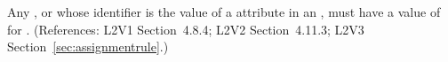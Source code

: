 Any \Compartment, \Species or \Parameter whose identifier is the value of a
 attribute in an \AssignmentRule, must have a value of
 for .  (References: L2V1 Section~4.8.4; L2V2
Section~4.11.3; L2V3 Section~\ref{sec:assignmentrule}.)

